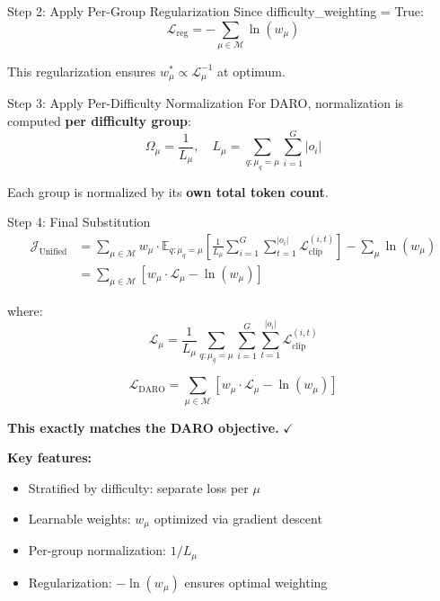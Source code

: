 \documentclass[11pt,a4paper]{article}
\begin{document}
\begin{proofbox}{Step 2: Apply Per-Group Regularization}
Since difficulty\_weighting = True:
\begin{equation}
\mathcal{L}_{\text{reg}} = -\sum_{\mu \in \mathcal{M}} \ln(w_\mu)
\end{equation}

This regularization ensures $w_\mu^* \propto \mathcal{L}_\mu^{-1}$ at optimum.
\end{proofbox}

\begin{proofbox}{Step 3: Apply Per-Difficulty Normalization}
For DARO, normalization is computed \textbf{per difficulty group}:
\begin{equation}
\Omega_\mu = \frac{1}{L_\mu}, \quad L_\mu = \sum_{q: \mu_q = \mu} \sum_{i=1}^G |o_i|
\end{equation}

Each group is normalized by its \textbf{own total token count}.
\end{proofbox}

\begin{proofbox}{Step 4: Final Substitution}
\begin{align}
\mathcal{J}_{\text{Unified}} &= \sum_{\mu \in \mathcal{M}} w_\mu \cdot \mathbb{E}_{q: \mu_q = \mu} \left[ \frac{1}{L_\mu} \sum_{i=1}^{G} \sum_{t=1}^{|o_i|} \mathcal{L}_{\text{clip}}^{(i,t)} \right] - \sum_{\mu} \ln(w_\mu) \\[10pt]
&= \sum_{\mu \in \mathcal{M}} \left[ w_\mu \cdot \mathcal{L}_\mu - \ln(w_\mu) \right]
\end{align}

where:
\begin{equation}
\mathcal{L}_\mu = \frac{1}{L_\mu} \sum_{q: \mu_q = \mu} \sum_{i=1}^{G} \sum_{t=1}^{|o_i|} \mathcal{L}_{\text{clip}}^{(i,t)}
\end{equation}
\end{proofbox}

\begin{resultbox}
\begin{equation}
\mathcal{L}_{\text{DARO}} = \sum_{\mu \in \mathcal{M}} \left[ w_\mu \cdot \mathcal{L}_\mu - \ln(w_\mu) \right]
\end{equation}

\textbf{This exactly matches the DARO objective.} $\checkmark$

\textbf{Key features:}
\begin{itemize}
    \item Stratified by difficulty: separate loss per $\mu$
    \item Learnable weights: $w_\mu$ optimized via gradient descent
    \item Per-group normalization: $1/L_\mu$
    \item Regularization: $-\ln(w_\mu)$ ensures optimal weighting
\end{itemize}
\end{resultbox}
\end{document}
